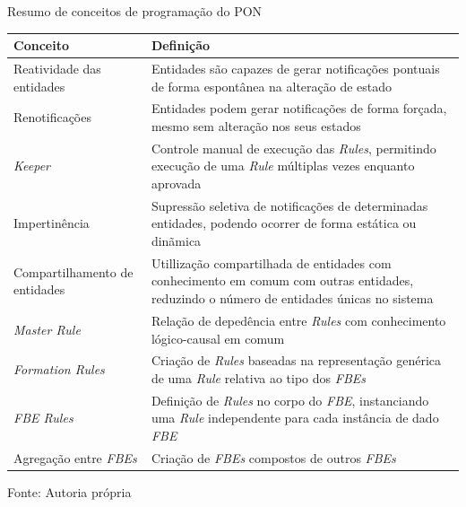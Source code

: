 \begin{tabframed}[!htb]
\centering
\caption{Resumo de conceitos de programação do PON}
\begin{tabularx}{\textwidth}{l|X}
Conceito                              & Definição                                                                                                                                  \\ \hline\hline
Reatividade das entidades             & Entidades são capazes de gerar notificações pontuais de forma espontânea na alteração de estado                                            \\ \hline
Renotificações                        & Entidades podem gerar notificações de forma forçada, mesmo sem alteração nos seus estados                                                  \\ \hline
\textit{Keeper}                       & Controle manual de execução das \textit{Rules}, permitindo execução de uma \textit{Rule} múltiplas vezes enquanto aprovada                 \\ \hline
Impertinência                         & Supressão seletiva de notificações de determinadas entidades, podendo ocorrer de forma estática ou dinãmica                                \\ \hline
Compartilhamento de entidades         & Utillização compartilhada de entidades com conhecimento em comum com outras entidades, reduzindo o número de entidades únicas no sistema   \\ \hline
\textit{Master Rule}                  & Relação de depedência entre \textit{Rules} com conhecimento lógico-causal em comum                                                         \\ \hline
\textit{Formation Rules}              & Criação de \textit{Rules} baseadas na representação genérica de uma \textit{Rule} relativa ao tipo dos \textit{FBEs}                       \\ \hline
\textit{FBE Rules}                    & Definição de \textit{Rules} no corpo do \textit{FBE}, instanciando uma \textit{Rule} independente para cada instância de dado \textit{FBE} \\ \hline
Agregação entre \textit{FBEs}         & Criação de \textit{FBEs} compostos de outros \textit{FBEs}                                                                                 \\ \hline
\end{tabularx}
\caption*{Fonte: Autoria própria}
\label{tab:resumo_conceitos}
\end{tabframed}

